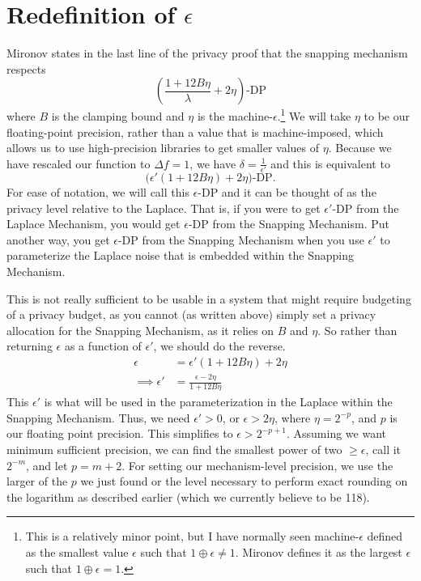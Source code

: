 \documentclass[11pt]{scrartcl} %
\begin{document}
\section{Redefinition of $\epsilon$}
Mironov states in the last line of the privacy proof that the snapping mechanism respects
\[ \left( \frac{1 + 12B\eta}{\lambda} + 2\eta \right)\text{-DP} \]
where $B$ is the clamping bound and $\eta$ is the machine-$\epsilon$.\footnote{This is a relatively minor point, but I have normally seen machine-$\epsilon$ defined as the smallest value $\epsilon$ such that $1 \oplus \epsilon \neq 1$. Mironov defines it as the largest $\epsilon$ such that $1 \oplus \epsilon = 1$.} We will take $\eta$ to be our floating-point precision, rather than a value that is machine-imposed, which allows us to use high-precision libraries to get smaller values of $\eta$.
Because we have rescaled our function to $\Delta f = 1$, we have $\delta = \frac{1}{\epsilon'}$ and this is equivalent to
\[ \big( \epsilon'(1 + 12B\eta) + 2\eta \big)\text{-DP}. \]
For ease of notation, we will call this $\epsilon$-DP and it can be thought of as the privacy level relative to the Laplace. That is, if you were to get $\epsilon'$-DP from the Laplace Mechanism, you would get $\epsilon$-DP from the Snapping Mechanism. Put another way, you get $\epsilon$-DP from the Snapping Mechanism when you use $\epsilon'$ to parameterize the Laplace noise that is embedded within the Snapping Mechanism. \newline

This is not really sufficient to be usable in a system that might require budgeting of a privacy budget, as you cannot (as written above) simply set a privacy allocation for the Snapping Mechanism, as it relies on $B$ and $\eta$. So rather than returning $\epsilon$ as a function of $\epsilon'$, we should do the reverse.
\begin{align}
             \epsilon &= \epsilon'(1 + 12B\eta) + 2\eta \nonumber \\
    \implies \epsilon' &= \frac{\epsilon - 2\eta}{1 + 12B \eta} \nonumber
\end{align}
This $\epsilon'$ is what will be used in the parameterization in the Laplace within the Snapping Mechanism. Thus, we need $\epsilon' > 0$, or $\epsilon > 2\eta$, where $\eta = 2^{-p}$, and $p$ is our floating point precision. This simplifies to $\epsilon > 2^{-p+1}$. Assuming we want minimum sufficient precision, we can find the smallest power of two $\geq \epsilon$, call it $2^{-m}$, and let $p = m+2$. For setting our mechanism-level precision, we use the larger of the $p$ we just found or the level necessary to perform exact rounding on the logarithm as described earlier (which we currently believe to be 118).
\end{document}
